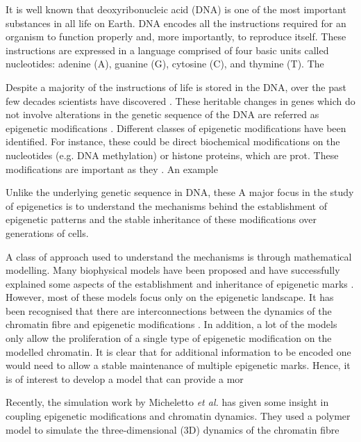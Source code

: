 \documentclass[12pt]{article}
\newcommand{\etal}{\emph{et al.}}
\begin{document}

It is well known that deoxyribonucleic acid (DNA) is one of the most important substances in all life on Earth. DNA encodes all the instructions required for an organism to function properly and, more importantly, to reproduce itself. These instructions are expressed in a language comprised of four basic units called nucleotides: adenine (A), guanine (G), cytosine (C), and thymine (T). The 

Despite a majority of the instructions of life is stored in the DNA, over the past few decades scientists have discovered . These heritable changes in genes which do not involve alterations in the genetic sequence of the DNA are referred as epigenetic modifications \cite{DNABook, probst2009}. Different classes of epigenetic modifications have been identified. For instance, these could be direct biochemical modifications on the nucleotides (e.g. DNA methylation) or histone proteins, which are prot. These modifications are important as they . An example 

Unlike the underlying genetic sequence in DNA, these 
A major focus in the study of epigenetics is to understand the mechanisms behind the establishment of epigenetic patterns and the stable inheritance of these modifications over generations of cells.

A class of approach used to understand the mechanisms is through mathematical modelling. Many biophysical models have been proposed and have successfully explained some aspects of the establishment and inheritance of epigenetic marks \cite{dodd2007, zhang2014, jost2014}. However, most of these models focus only on the epigenetic landscape. It has been recognised that there are interconnections between the dynamics of the chromatin fibre and epigenetic modifications \cite{}. In addition, a lot of the models only allow the proliferation of a single type of epigenetic modification on the modelled chromatin. It is clear that for additional information to be encoded one would need to allow a stable maintenance of multiple epigenetic marks. Hence, it is of interest to develop a model that can provide a mor

Recently, the simulation work by Micheletto \etal \cite{michieletto2016} has given some insight in coupling epigenetic modifications and chromatin dynamics. They used a polymer model to simulate the three-dimensional (3D) dynamics of the chromatin fibre 
\end{document}
